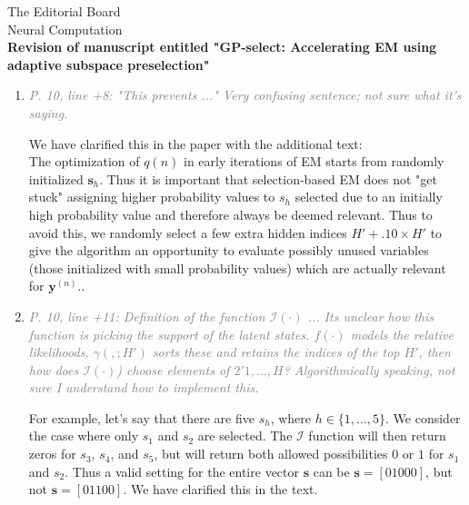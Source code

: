 \documentclass[10pt]{letter}
\newcommand{\rvr}[1]{\textcolor{gray}{#1}}
\renewcommand{\vec}[1]{{\mathbf{#1}}}
\newcommand{\II}{{\cal I}}
\begin{document}
\begin{letter}{
The Editorial Board\\
Neural Computation\\
\vspace{10mm}
\textbf{Revision of manuscript entitled "GP-select: Accelerating EM using adaptive
subspace preselection"}
}
\begin{enumerate}[topsep=3pt,itemsep=2ex,partopsep=1ex,parsep=1ex]
\begin{equation}
\label{eq:marginals-product}
\sum_{\vec{s}\; \text{with}\; s_h=0 \;\text{for all}\; h\not\in\II} p(s_1,...s_H \, | \, \vec{y}, \Theta) = \prod_{h\not\in\II} (1 - p(s_h=1 \,|\, \vec{y}, \Theta)).
\end{equation} 

We want this mass to be as large as possible as its complement is the posterior mass that we discard with our approximation. If the affinity function correctly estimates the marginals $p(s_h=1 \,|\, \vec{y}, \Theta)$, then discarding those $(H-H')$ marginals with lowest values is equivalent to discarding the space with the least posterior mass (compared to discarding w.r.t. all alternative choices with the same number of latents). 




    \item \rvr{\emph{P. 10, line +8: "This prevents ..."  Very confusing sentence; not sure what it's saying.}}

We have clarified this in the paper with the additional text:\\
The optimization of $q(n)$ in early iterations of EM starts from randomly initialized $\vec{s}_h$. Thus it is important that selection-based EM does not "get stuck" assigning higher probability values to $s_h$ selected due to an initially high probability value and therefore always be deemed relevant. Thus to avoid this, we randomly select a few extra hidden indices $H' + .10\times H'$ to give the algorithm an opportunity to evaluate possibly unused variables (those initialized with small probability values) which are actually relevant for $\vec{y}^{(n)}$..


    \item \rvr{\emph{P. 10, line +11: Definition of the function $\mathcal{I}( \cdot )$ ... Its unclear how this function is picking the support of the latent states. $f( \cdot )$ models the relative likelihoods, $\gamma( , ; H' )$ sorts these and retains the indices of the top $H'$, then how does $\mathcal{I}( \cdot )$) choose elements of $2'{1 ,...,H}$? Algorithmically speaking, not sure I understand how to implement this.}}

For example, let's say that there are five $s_h$, where $h\in \{1,...,5\}$. We consider the case where only $s_1$   and $s_2$   are selected.  The $\mathcal{I}$ function will then return zeros for $s_3$, $s_4$, and $s_5$, but will  return both allowed possibilities $0$ or $1$ for $s_1$ and $s_2$. Thus a valid setting for the entire vector $\vec{s}$ can be $\vec{s}=[0 1 0 0 0]$, but not $\vec{s}=[0 1 1 0 0]$. We have clarified this in the text.


\end{enumerate}
\end{letter}
\end{document}
